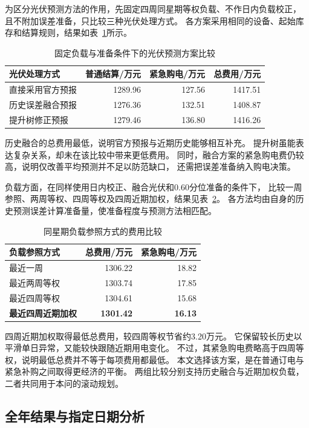 为区分光伏预测方法的作用，先固定四周同星期等权负载、不作日内负载校正，
且不附加误差准备，只比较三种光伏处理方式。
各方案采用相同的设备、起始库存和结算规则，结果如表~\ref{tab:q3_candidate}所示。

\begin{table}[H]
\centering
\caption{固定负载与准备条件下的光伏预测方案比较}
\label{tab:q3_candidate}
\begin{tabular}{lrrr}
\toprule
光伏处理方式 & 普通结算/万元 & 紧急购电/万元 & 总费用/万元\\
\midrule
直接采用官方预报 &1289.96&127.56&1417.51\\
历史误差融合预报 &1276.36&132.51&1408.87\\
提升树修正预报 &1279.46&136.80&1416.26\\
\bottomrule
\end{tabular}
\end{table}

历史融合的总费用最低，说明官方预报与近期历史能够相互补充。
提升树虽能表达复杂关系，却未在该比较中带来更低费用。
同时，融合方案的紧急购电费仍较高，说明仅改善平均预测并不足以防范缺口，
还需把误差准备纳入购电决策。

负载方面，在同样使用日内校正、融合光伏和0.60分位准备的条件下，
比较一周参照、两周等权、四周等权及四周近期加权，结果见表~\ref{tab:q3_load_compare}。
各方法均由自身的历史预测误差计算准备量，使准备程度与预测方法相匹配。

\begin{table}[H]
\centering
\caption{同星期负载参照方式的费用比较}
\label{tab:q3_load_compare}
\begin{tabular}{lrr}
\toprule
负载参照方式 & 总费用/万元 & 紧急购电/万元\\
\midrule
最近一周 &1306.22&18.82\\
最近两周等权 &1303.74&17.85\\
最近四周等权 &1304.61&15.68\\
\textbf{最近四周近期加权} &\textbf{1301.42}&\textbf{16.13}\\
\bottomrule
\end{tabular}
\end{table}

四周近期加权取得最低总费用，较四周等权节省约3.20万元。
它保留较长历史以平滑单日异常，又能较快跟随近期用电变化。
不过，其紧急购电费略高于四周等权，说明最低总费并不等于每项费用都最低。
本文选择该方案，是在普通订电与紧急补购之间取得更经济的平衡。
两组比较分别支持历史融合与近期加权负载，二者共同用于本问的滚动规划。

\subsection{全年结果与指定日期分析}

